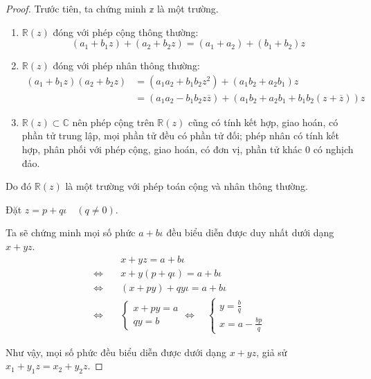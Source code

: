 \documentclass[class=linearalgebra,crop=false]{standalone}
\begin{document}
\begin{proof}Trước tiên, ta chứng minh $\mathbb{z}$ là một trường.
    \begin{enumerate}[label = (\roman*)]
        \item $\mathbb{R}(z)$ đóng với phép cộng thông thường:
        \[ (a_{1} + b_{1}z) + (a_{2} + b_{2}z) = (a_{1} + a_{2}) + (b_{1} + b_{2})z \]
        \item $\mathbb{R}(z)$ đóng với phép nhân thông thường:
        \begin{align*}
            (a_{1} + b_{1}z)(a_{2} + b_{2}z) &= (a_{1}a_{2} + b_{1}b_{2}z^{2}) + (a_{1}b_{2} + a_{2}b_{1})z \\
                                             &= (a_{1}a_{2} - b_{1}b_{2}z\overline{z}) + (a_{1}b_{2} + a_{2}b_{1} + b_{1}b_{2}(z + \overline{z}))z
        \end{align*}
        \item $\mathbb{R}(z) \subset \mathbb{C}$ nên phép cộng trên $\mathbb{R}(z)$ cũng có tính kết hợp, giao hoán, có phần tử trung lập, mọi phần tử đều có phần tử đối; phép nhân có tính kết hợp, phân phối với phép cộng, giao hoán, có đơn vị, phần tử khác 0 có nghịch đảo.
    \end{enumerate}
    \par Do đó $\mathbb{R}(z)$ là một trường với phép toán cộng và nhân thông thường.
    \par Đặt $z = p + q\iota \quad (q\ne 0)$.
    \par Ta sẽ chứng minh mọi số phức $a + b\iota$ đều biểu diễn được duy nhất dưới dạng $x + yz$.
    \begin{align*}
        &x + yz = a + b\iota \\
        \Leftrightarrow\quad& x + y(p + q\iota) = a + b\iota \\
        \Leftrightarrow\quad& (x + py) + qy\iota = a + b\iota \\
        \Leftrightarrow\quad&
        \begin{cases}
            x + py = a \\
            qy = b
        \end{cases}
        \Leftrightarrow\quad
        \begin{cases}
            y = \frac{b}{q} \\
            x = a - \frac{bp}{q}
        \end{cases}
    \end{align*}
    \par Như vậy, mọi số phức đều biểu diễn được dưới dạng $x + yz$, giả sử $x_{1} + y_{1}z = x_{2} + y_{2}z$.

\end{proof}
\end{document}
